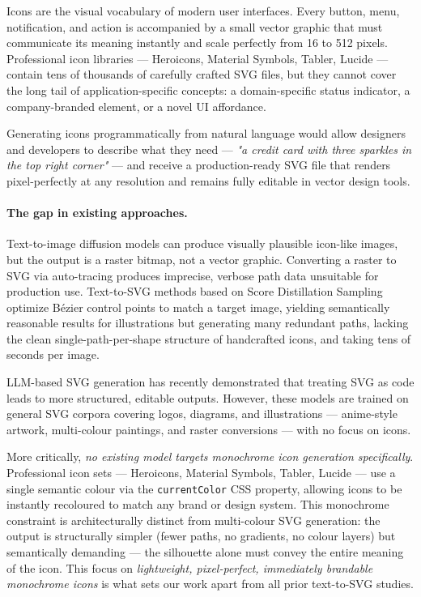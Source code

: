 
Icons are the visual vocabulary of modern user interfaces. Every button, menu,
notification, and action is accompanied by a small vector graphic that must
communicate its meaning instantly and scale perfectly from 16 to 512 pixels.
Professional icon libraries --- Heroicons, Material Symbols, Tabler, Lucide ---
contain tens of thousands of carefully crafted SVG files, but they cannot cover
the long tail of application-specific concepts: a domain-specific status
indicator, a company-branded element, or a novel UI affordance.

Generating icons programmatically from natural language would allow designers
and developers to describe what they need --- \textit{"a credit card with three
sparkles in the top right corner"} --- and receive a production-ready SVG file
that renders pixel-perfectly at any resolution and remains fully editable in
vector design tools.

\paragraph{The gap in existing approaches.}
Text-to-image diffusion models \citep{rombach2022ldm, saharia2022imagen} can
produce visually plausible icon-like images, but the output is a raster bitmap,
not a vector graphic. Converting a raster to SVG via auto-tracing produces
imprecise, verbose path data unsuitable for production use. Text-to-SVG methods
based on Score Distillation Sampling \citep{jain2023vectorfusion, xing2024svgdreamer}
optimize Bézier control points to match a target image, yielding semantically
reasonable results for illustrations but generating many redundant paths,
lacking the clean single-path-per-shape structure of handcrafted icons, and
taking tens of seconds per image.

LLM-based SVG generation \citep{rodriguez2025starvector, yang2025omnisvg,
xing2025llm4svg} has recently demonstrated that treating SVG as code leads to
more structured, editable outputs. However, these models are trained on general
SVG corpora covering logos, diagrams, and illustrations --- anime-style artwork,
multi-colour paintings, and raster conversions --- with no focus on icons.

More critically, \emph{no existing model targets monochrome icon generation
specifically}. Professional icon sets --- Heroicons, Material Symbols, Tabler,
Lucide --- use a single semantic colour via the \texttt{currentColor} CSS
property, allowing icons to be instantly recoloured to match any brand or design
system. This monochrome constraint is architecturally distinct from multi-colour
SVG generation: the output is structurally simpler (fewer paths, no gradients,
no colour layers) but semantically demanding --- the silhouette alone must convey
the entire meaning of the icon. This focus on \emph{lightweight, pixel-perfect,
immediately brandable monochrome icons} is what sets our work apart from all
prior text-to-SVG studies.

